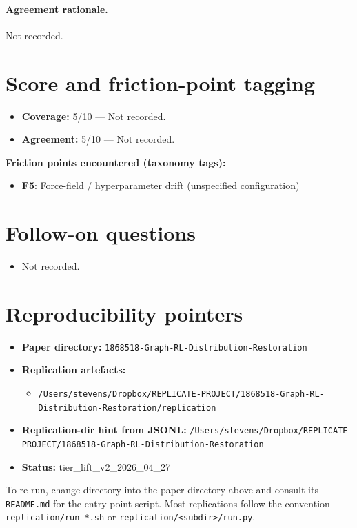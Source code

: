 \documentclass[11pt]{article}
\begin{document}
\paragraph{Agreement rationale.} Not recorded.

\section{Score and friction-point tagging}\label{sec:friction}
\begin{itemize}
\item \textbf{Coverage:} 5/10 --- Not recorded.
\item \textbf{Agreement:} 5/10 --- Not recorded.
\end{itemize}

\noindent\textbf{Friction points encountered (taxonomy tags):}
\begin{itemize}
\item \textbf{F5}: Force-field / hyperparameter drift (unspecified configuration)
\end{itemize}

\section{Follow-on questions}
\begin{itemize}
\item Not recorded.
\end{itemize}

\section{Reproducibility pointers}\label{sec:repro}
\begin{itemize}
\item \textbf{Paper directory:} \texttt{1868518-Graph-RL-Distribution-Restoration}
\item \textbf{Replication artefacts:}
\begin{itemize}
\item \texttt{/Users/stevens/Dropbox/REPLICATE-PROJECT/1868518-Graph-RL-Distribution-Restoration/replication}
\end{itemize}
\item \textbf{Replication-dir hint from JSONL:} \texttt{/Users/stevens/Dropbox/REPLICATE-PROJECT/1868518-Graph-RL-Distribution-Restoration}
\item \textbf{Status:} tier\_lift\_v2\_2026\_04\_27
\end{itemize}

To re-run, change directory into the paper directory above and consult its \texttt{README.md} for the entry-point script. Most replications follow the convention \texttt{replication/run\_*.sh} or \texttt{replication/<subdir>/run.py}.
\end{document}
